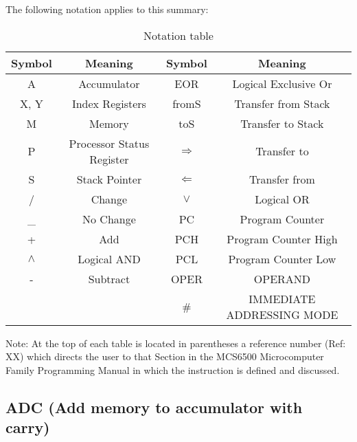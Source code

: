 \documentclass{article}
\begin{document}
  The following notation applies to this summary:
    \begin{table}[h!]
    \centering
    \begin{tabular}{|c c|c c|}
    \hline
    Symbol & Meaning                 &    Symbol & Meaning \\
    \hline
     A   &   Accumulator             &    EOR  &  Logical Exclusive Or \\
     X, Y  & Index Registers         &    fromS & Transfer from Stack \\
     M   &   Memory                  &    toS  &  Transfer to Stack \\
     P   &   Processor Status Register  & $\Rightarrow$   &  Transfer to \\
     S   &   Stack Pointer        &       $\Leftarrow$   &  Transfer from \\
     /   &   Change           &           $\lor$   &   Logical OR \\
     \_   &   No Change           &        PC   &  Program Counter \\
     +   &   Add             &            PCH  &  Program Counter High \\
     $\land$  &   Logical AND        &         PCL  &  Program Counter Low \\
     -   &   Subtract          &          OPER  & OPERAND \\
         &                 &              \#   &   IMMEDIATE ADDRESSING MODE \\
    \hline
  \end{tabular}
  \caption{Notation table}
  \end{table}

  Note: At the top of each table is located in parentheses a reference
        number (Ref: XX) which directs the user to that Section in the
        MCS6500 Microcomputer Family Programming Manual in which the
        instruction is defined and discussed.




  \subsection{ADC (Add memory to accumulator with carry)}
\end{document}
